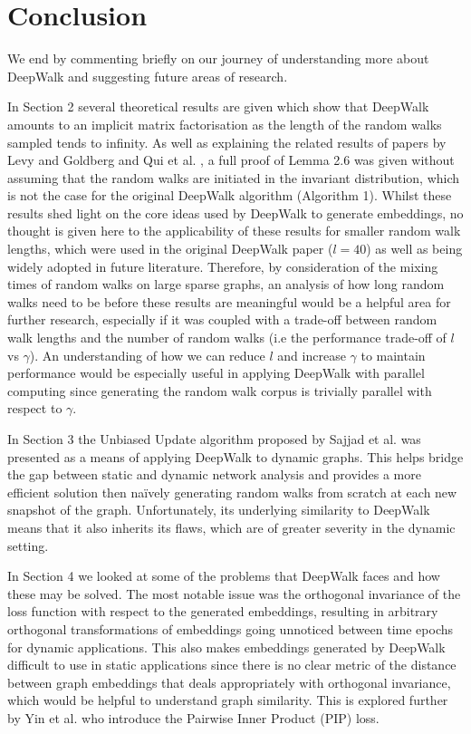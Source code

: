 \documentclass[a4paper]{article}
\begin{document}
\section{Conclusion}
We end by commenting briefly on our journey of understanding more about DeepWalk and suggesting future areas of research.

In Section 2 several theoretical results are given which show that DeepWalk amounts to an implicit matrix factorisation as the length of the random walks sampled tends to infinity.
As well as explaining the related results of papers by Levy and Goldberg \cite{levy&goldberg} and  Qui et al. \cite{qiu2018}, a full proof of Lemma 2.6 was given without assuming that the random walks are initiated in the invariant distribution, which is not the case for the original DeepWalk algorithm (Algorithm 1).
Whilst these results shed light on the core ideas used by DeepWalk to generate embeddings, no thought is given here to the applicability of these results for smaller random walk lengths, which were used in the original DeepWalk paper ($l = 40$) as well as being widely adopted in future literature. Therefore, by consideration of the mixing times of random walks on large sparse graphs, an analysis of how long random walks need to be before these
results are meaningful would be a helpful area for further research, especially if it was coupled with a trade-off between random walk lengths and the number of random walks (i.e the performance trade-off of $l$ vs $\gamma$). An understanding of how we can reduce $l$ and increase $\gamma$ to maintain performance would be especially useful in applying DeepWalk with parallel computing since generating the random walk corpus is trivially parallel with respect to $\gamma$.

In Section 3 the Unbiased Update algorithm proposed by Sajjad et al. \cite{sajjad2019} was presented as a means of applying DeepWalk to dynamic graphs. This helps bridge the gap between static and dynamic network analysis and provides a more efficient solution then naïvely generating random walks from scratch at each new snapshot of the graph. Unfortunately, its underlying similarity to DeepWalk means that it also inherits its flaws,
 which are of greater severity in the dynamic setting.

In Section 4 we looked at some of the problems that DeepWalk faces and how these may be solved. The most notable issue was the orthogonal invariance of the loss function with respect to the generated embeddings, resulting in arbitrary orthogonal transformations of embeddings going unnoticed
between time epochs for dynamic applications. This also makes embeddings generated by DeepWalk difficult to use in static applications since there is no clear metric of the distance between graph embeddings that deals appropriately with orthogonal invariance, which would be helpful to understand graph similarity. This is explored further by Yin et al. \cite{yin2018} who introduce the Pairwise Inner Product (PIP) loss.
\end{document}
